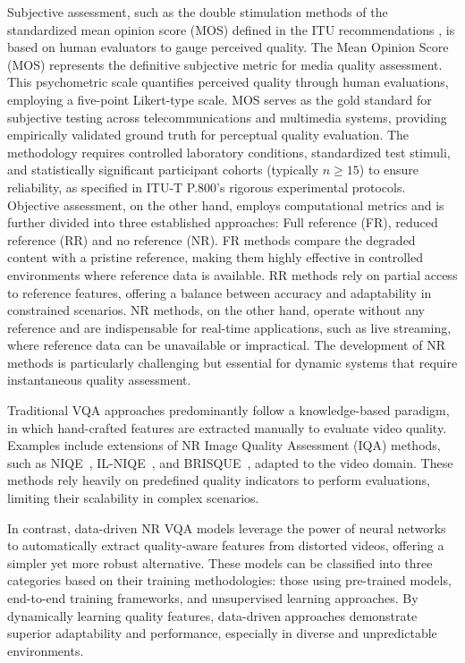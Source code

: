 Subjective assessment, such as the double stimulation methods of the standardized mean opinion score (MOS) defined in the ITU recommendations \cite{itu2017p800}, is based on human evaluators to gauge perceived quality. The Mean Opinion Score (MOS) represents the definitive subjective metric for media quality assessment. This psychometric scale quantifies perceived quality through human evaluations, employing a five-point Likert-type scale. MOS serves as the gold standard for subjective testing across telecommunications and multimedia systems, providing empirically validated ground truth for perceptual quality evaluation. The methodology requires controlled laboratory conditions, standardized test stimuli, and statistically significant participant cohorts (typically $n \geq 15$) to ensure reliability, as specified in ITU-T P.800's \cite{itu2017p800} rigorous experimental protocols.  
Objective assessment, on the other hand, employs computational metrics and is further divided into three established approaches: Full reference (FR), reduced reference (RR) and no reference (NR). FR methods compare the degraded content with a pristine reference, making them highly effective in controlled environments where reference data is available. RR methods rely on partial access to reference features, offering a balance between accuracy and adaptability in constrained scenarios. NR methods, on the other hand, operate without any reference and are indispensable for real-time applications, such as live streaming, where reference data can be unavailable or impractical. The development of NR methods is particularly challenging but essential for dynamic systems that require instantaneous quality assessment. 

Traditional VQA approaches predominantly follow a knowledge-based paradigm, in which hand-crafted features are extracted manually to evaluate video quality. Examples include extensions of NR Image Quality Assessment (IQA) methods, such as NIQE~\cite{mittal2012no}, IL-NIQE~\cite{zhang2015feature}, and BRISQUE~\cite{mittal2012completely}, adapted to the video domain. These methods rely heavily on predefined quality indicators to perform evaluations, limiting their scalability in complex scenarios. 

In contrast, data-driven NR VQA models leverage the power of neural networks to automatically extract quality-aware features from distorted videos, offering a simpler yet more robust alternative. These models can be classified into three categories based on their training methodologies: those using pre-trained models, end-to-end training frameworks, and unsupervised learning approaches. By dynamically learning quality features, data-driven approaches demonstrate superior adaptability and performance, especially in diverse and unpredictable environments.

